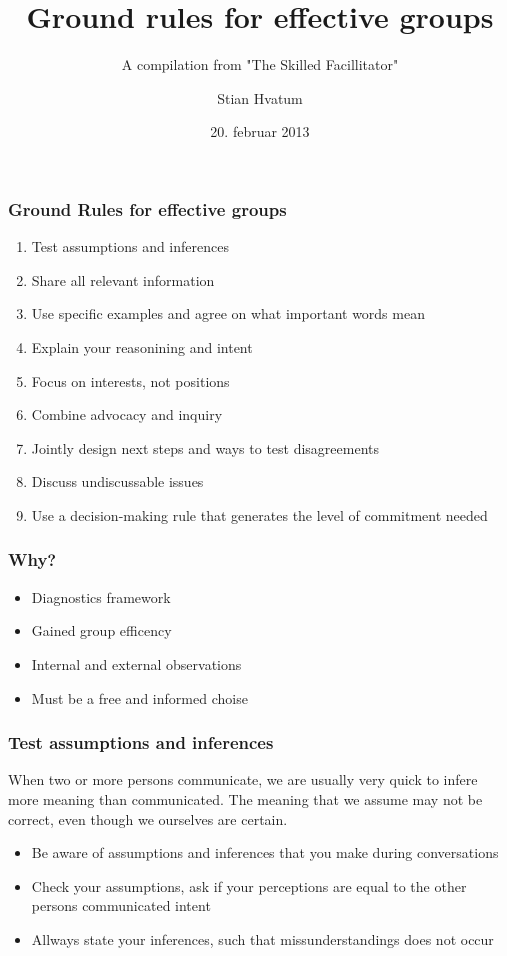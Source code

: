 \documentclass[screen]{beamer}
\title[Effective groups]%
{Ground rules for effective groups}
\subtitle{A compilation from "The Skilled Facillitator"}
\author[S. Hvatum]{Stian Hvatum}
\institute[NTNU]{Institutt for datateknikk og informatikk}
\date{20. februar 2013}
\begin{document}
\ntnutitlepage

\begin{frame}
  \frametitle{Ground Rules for effective groups}

  \begin{enumerate}
    \item Test assumptions and inferences
    \item Share all relevant information
    \item Use specific examples and agree on what important words mean
    \item Explain your reasonining and intent
    \item Focus on interests, not positions
    \item Combine advocacy and inquiry
    \item Jointly design next steps and ways to test disagreements
    \item Discuss undiscussable issues
    \item Use a decision-making rule that generates the level of commitment needed
  \end{enumerate}

\end{frame}

\begin{frame}
    \frametitle{Why?}

    \begin{itemize}
        \item Diagnostics framework
        \item Gained group efficency
        \item Internal and external observations
        \item Must be a free and informed choise
    \end{itemize}

\end{frame}
\begin{frame}
    \frametitle{Test assumptions and inferences}

When two or more persons communicate, we are usually very quick to infere more meaning than communicated. The meaning that we assume may not be correct,
even though we ourselves are certain.

    \begin{itemize}
        \item Be aware of assumptions and inferences that you make during conversations
        \item Check your assumptions, ask if your perceptions are equal to the other persons communicated intent
        \item Allways state your inferences, such that missunderstandings does not occur
    \end{itemize}

\end{frame}
\end{document}
